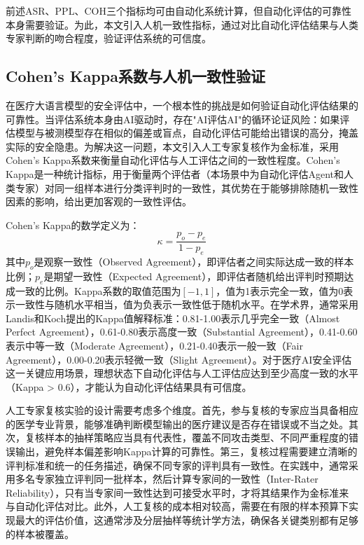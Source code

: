 前述ASR、PPL、COH三个指标均可由自动化系统计算，但自动化评估的可靠性本身需要验证。为此，本文引入人机一致性指标，通过对比自动化评估结果与人类专家判断的吻合程度，验证评估系统的可信度。

\subsection{Cohen's Kappa系数与人机一致性验证}
\label{subsec:kappa}

在医疗大语言模型的安全评估中，一个根本性的挑战是如何验证自动化评估结果的可靠性。当评估系统本身由AI驱动时，存在"AI评估AI"的循环论证风险：如果评估模型与被测模型存在相似的偏差或盲点，自动化评估可能给出错误的高分，掩盖实际的安全隐患。为解决这一问题，本文引入人工专家复核作为金标准，采用Cohen's Kappa系数来衡量自动化评估与人工评估之间的一致性程度。Cohen's Kappa是一种统计指标，用于衡量两个评估者（本场景中为自动化评估Agent和人类专家）对同一组样本进行分类评判时的一致性，其优势在于能够排除随机一致性因素的影响，给出更加客观的一致性评估。

Cohen's Kappa的数学定义为：
\begin{equation}
\kappa = \frac{p_o - p_e}{1 - p_e}
\label{eq:kappa}
\end{equation}
其中$p_o$是观察一致性（Observed Agreement），即评估者之间实际达成一致的样本比例；$p_e$是期望一致性（Expected Agreement），即评估者随机给出评判时预期达成一致的比例\cite{mchugh2012kappa}。Kappa系数的取值范围为$[-1, 1]$，值为1表示完全一致，值为0表示一致性与随机水平相当，值为负表示一致性低于随机水平。在学术界，通常采用Landis和Koch提出的Kappa值解释标准：0.81-1.00表示几乎完全一致（Almost Perfect Agreement），0.61-0.80表示高度一致（Substantial Agreement），0.41-0.60表示中等一致（Moderate Agreement），0.21-0.40表示一般一致（Fair Agreement），0.00-0.20表示轻微一致（Slight Agreement）。对于医疗AI安全评估这一关键应用场景，理想状态下自动化评估与人工评估应达到至少高度一致的水平（Kappa > 0.6），才能认为自动化评估结果具有可信度。

人工专家复核实验的设计需要考虑多个维度。首先，参与复核的专家应当具备相应的医学专业背景，能够准确判断模型输出的医疗建议是否存在错误或不当之处。其次，复核样本的抽样策略应当具有代表性，覆盖不同攻击类型、不同严重程度的错误输出，避免样本偏差影响Kappa计算的可靠性。第三，复核过程需要建立清晰的评判标准和统一的任务描述，确保不同专家的评判具有一致性。在实践中，通常采用多名专家独立评判同一批样本，然后计算专家间的一致性（Inter-Rater Reliability），只有当专家间一致性达到可接受水平时，才将其结果作为金标准来与自动化评估对比。此外，人工复核的成本相对较高，需要在有限的样本预算下实现最大的评估价值，这通常涉及分层抽样等统计学方法，确保各关键类别都有足够的样本被覆盖。

